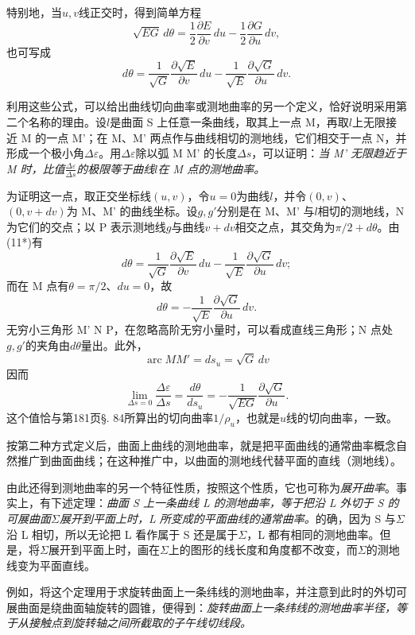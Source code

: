特别地，当\(u,v\)线正交时，得到简单方程
\[
 \sqrt{EG}\,d\theta=\frac12\frac{\partial E}{\partial v}\,du-\frac12\frac{\partial G}{\partial u}\,dv,
\]
也可写成
\begin{equation}\tag{11*}
 d\theta=\frac1{\sqrt G}\frac{\partial\sqrt E}{\partial v}\,du-\frac1{\sqrt E}\frac{\partial\sqrt G}{\partial u}\,dv.
\end{equation}

利用这些公式，可以给出曲线切向曲率或测地曲率的另一个定义，恰好说明采用第二个名称的理由。设\(l\)是曲面 S 上任意一条曲线，取其上一点 M，再取\(l\)上无限接近 M 的一点 M'；在 M、M' 两点作与曲线相切的测地线，它们相交于一点 N，并形成一个极小角\(\Delta\varepsilon\)。用\(\Delta\varepsilon\)除以弧 M M' 的长度\(\Delta s\)，可以证明：\emph{当 M' 无限趋近于 M 时，比值\(\frac{\Delta\varepsilon}{\Delta s}\)的极限等于曲线\(l\)在 M 点的测地曲率。}

为证明这一点，取正交坐标线\((u,v)\)，令\(u=0\)为曲线\(l\)，并令\((0,v)\)、\((0,v+dv)\)为 M、M' 的曲线坐标。设\(g,g'\)分别是在 M、M' 与\(l\)相切的测地线，N 为它们的交点；以 P 表示测地线\(g\)与曲线\(v+dv\)相交之点，其交角为\(\pi/2+d\theta\)。由(11*)有
\[
 d\theta=\frac1{\sqrt G}\frac{\partial\sqrt E}{\partial v}\,du-\frac1{\sqrt E}\frac{\partial\sqrt G}{\partial u}\,dv;
\]
而在 M 点有\(\theta=\pi/2\)、\(du=0\)，故
\[
 d\theta=-\frac1{\sqrt E}\frac{\partial\sqrt G}{\partial u}\,dv.
\]
无穷小三角形 M' N P，在忽略高阶无穷小量时，可以看成直线三角形；N 点处\(g,g'\)的夹角由\(d\theta\)量出。此外，
\[
 \operatorname{arc}MM'=ds_u=\sqrt G\,dv
\]
因而
\[
 \lim_{\Delta s=0}\frac{\Delta\varepsilon}{\Delta s}=\frac{d\theta}{ds_u}=-\frac1{\sqrt{EG}}\frac{\partial\sqrt G}{\partial u}.
\]
这个值恰与第181页\S. 84所算出的切向曲率\(1/\rho_u\)，也就是\(u\)线的切向曲率，一致。

按第二种方式定义后，曲面上曲线的测地曲率，就是把平面曲线的通常曲率概念自然推广到曲面曲线；在这种推广中，以曲面的测地线代替平面的直线（测地线）。

由此还得到测地曲率的另一个特征性质，按照这个性质，它也可称为\emph{展开曲率}。事实上，有下述定理：\emph{曲面 S 上一条曲线 L 的测地曲率，等于把沿 L 外切于 S 的可展曲面\(\Sigma\)展开到平面上时，L 所变成的平面曲线的通常曲率。}的确，因为 S 与\(\Sigma\)沿 L 相切，所以无论把 L 看作属于 S 还是属于\(\Sigma\)，L 都有相同的测地曲率。但是，将\(\Sigma\)展开到平面上时，画在\(\Sigma\)上的图形的线长度和角度都不改变，而\(\Sigma\)的测地线变为平面直线。

例如，将这个定理用于求旋转曲面上一条纬线的测地曲率，并注意到此时的外切可展曲面是绕曲面轴旋转的圆锥，便得到：\emph{旋转曲面上一条纬线的测地曲率半径，等于从接触点到旋转轴之间所截取的子午线切线段。}

